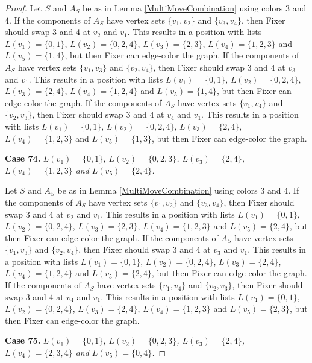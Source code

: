 \documentclass[12pt]{amsart}
\theoremstyle{plain}
\theoremstyle{definition}
\theoremstyle{remark}
\begin{document}
\begin{proof}
Let $S$ and $A_S$ be as in Lemma \ref{MultiMoveCombination} using colors $3$ and $4$. If the components of $A_S$ have vertex sets $\{v_1, v_2\}$ and $\{v_3, v_4\}$, then Fixer should swap 3 and 4 at $v_2$ and $v_1$. This results in a position with lists $L(v_1) = \{0, 1\}$, $L(v_2) = \{0, 2, 4\}$, $L(v_3) = \{2, 3\}$, $L(v_4) = \{1, 2, 3\}$ and $L(v_5) = \{1, 4\}$, but then Fixer can edge-color the graph.
If the components of $A_S$ have vertex sets $\{v_1, v_3\}$ and $\{v_2, v_4\}$, then Fixer should swap 3 and 4 at $v_3$ and $v_1$. This results in a position with lists $L(v_1) = \{0, 1\}$, $L(v_2) = \{0, 2, 4\}$, $L(v_3) = \{2, 4\}$, $L(v_4) = \{1, 2, 4\}$ and $L(v_5) = \{1, 4\}$, but then Fixer can edge-color the graph.
If the components of $A_S$ have vertex sets $\{v_1, v_4\}$ and $\{v_2, v_3\}$, then Fixer should swap 3 and 4 at $v_4$ and $v_1$. This results in a position with lists $L(v_1) = \{0, 1\}$, $L(v_2) = \{0, 2, 4\}$, $L(v_3) = \{2, 4\}$, $L(v_4) = \{1, 2, 3\}$ and $L(v_5) = \{1, 3\}$, but then Fixer can edge-color the graph.

\noindent\textbf{Case 74.  }\textit{$L(v_1) = \{0, 1\}$, $L(v_2) = \{0, 2, 3\}$, $L(v_3) = \{2, 4\}$, $L(v_4) = \{1, 2, 3\}$ and $L(v_5) = \{2, 4\}$.}

Let $S$ and $A_S$ be as in Lemma \ref{MultiMoveCombination} using colors $3$ and $4$. If the components of $A_S$ have vertex sets $\{v_1, v_2\}$ and $\{v_3, v_4\}$, then Fixer should swap 3 and 4 at $v_2$ and $v_1$. This results in a position with lists $L(v_1) = \{0, 1\}$, $L(v_2) = \{0, 2, 4\}$, $L(v_3) = \{2, 3\}$, $L(v_4) = \{1, 2, 3\}$ and $L(v_5) = \{2, 4\}$, but then Fixer can edge-color the graph.
If the components of $A_S$ have vertex sets $\{v_1, v_3\}$ and $\{v_2, v_4\}$, then Fixer should swap 3 and 4 at $v_3$ and $v_1$. This results in a position with lists $L(v_1) = \{0, 1\}$, $L(v_2) = \{0, 2, 4\}$, $L(v_3) = \{2, 4\}$, $L(v_4) = \{1, 2, 4\}$ and $L(v_5) = \{2, 4\}$, but then Fixer can edge-color the graph.
If the components of $A_S$ have vertex sets $\{v_1, v_4\}$ and $\{v_2, v_3\}$, then Fixer should swap 3 and 4 at $v_4$ and $v_1$. This results in a position with lists $L(v_1) = \{0, 1\}$, $L(v_2) = \{0, 2, 4\}$, $L(v_3) = \{2, 4\}$, $L(v_4) = \{1, 2, 3\}$ and $L(v_5) = \{2, 3\}$, but then Fixer can edge-color the graph.

\noindent\textbf{Case 75.  }\textit{$L(v_1) = \{0, 1\}$, $L(v_2) = \{0, 2, 3\}$, $L(v_3) = \{2, 4\}$, $L(v_4) = \{2, 3, 4\}$ and $L(v_5) = \{0, 4\}$.}


\end{proof}
\end{document}
